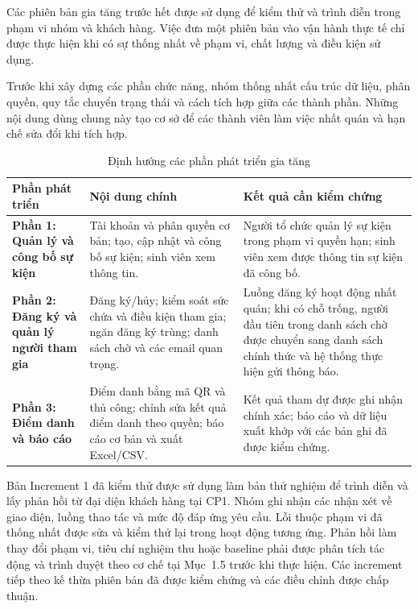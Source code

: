 Các phiên bản gia tăng trước hết được sử dụng để kiểm thử và trình diễn trong phạm vi nhóm và khách hàng. Việc đưa một phiên bản vào vận hành thực tế chỉ được thực hiện khi có sự thống nhất về phạm vi, chất lượng và điều kiện sử dụng.


Trước khi xây dựng các phần chức năng, nhóm thống nhất cấu trúc dữ liệu, phân quyền, quy tắc chuyển trạng thái và cách tích hợp giữa các thành phần. Những nội dung dùng chung này tạo cơ sở để các thành viên làm việc nhất quán và hạn chế sửa đổi khi tích hợp.

\begin{table}[H]
\centering
\renewcommand{\arraystretch}{1.2}
\begin{tabularx}{\textwidth}{|p{3.6cm}|X|X|}
\hline
\textbf{Phần phát triển} & \textbf{Nội dung chính} & \textbf{Kết quả cần kiểm chứng} \\
\hline
\textbf{Phần 1: Quản lý và công bố sự kiện} & Tài khoản và phân quyền cơ bản; tạo, cập nhật và công bố sự kiện; sinh viên xem thông tin. & Người tổ chức quản lý sự kiện trong phạm vi quyền hạn; sinh viên xem được thông tin sự kiện đã công bố. \\
\hline
\textbf{Phần 2: Đăng ký và quản lý người tham gia} & Đăng ký/hủy; kiểm soát sức chứa và điều kiện tham gia; ngăn đăng ký trùng; danh sách chờ và các email quan trọng. & Luồng đăng ký hoạt động nhất quán; khi có chỗ trống, người đầu tiên trong danh sách chờ được chuyển sang danh sách chính thức và hệ thống thực hiện gửi thông báo. \\
\hline
\textbf{Phần 3: Điểm danh và báo cáo} & Điểm danh bằng mã QR và thủ công; chỉnh sửa kết quả điểm danh theo quyền; báo cáo cơ bản và xuất Excel/CSV. & Kết quả tham dự được ghi nhận chính xác; báo cáo và dữ liệu xuất khớp với các bản ghi đã được kiểm chứng. \\
\hline
\end{tabularx}
\caption{Định hướng các phần phát triển gia tăng}
\label{tab:development-increments}
\end{table}

Bản Increment 1 đã kiểm thử được sử dụng làm bản thử nghiệm để trình diễn và lấy phản hồi từ đại diện khách hàng tại CP1. Nhóm ghi nhận các nhận xét về giao diện, luồng thao tác và mức độ đáp ứng yêu cầu. Lỗi thuộc phạm vi đã thống nhất được sửa và kiểm thử lại trong hoạt động tương ứng. Phản hồi làm thay đổi phạm vi, tiêu chí nghiệm thu hoặc baseline phải được phân tích tác động và trình duyệt theo cơ chế tại Mục~1.5 trước khi thực hiện. Các increment tiếp theo kế thừa phiên bản đã được kiểm chứng và các điều chỉnh được chấp thuận.

